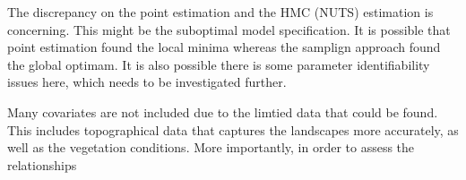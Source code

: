 \documentclass{article}
\begin{document}
The discrepancy on the point estimation and the HMC (NUTS) estimation is concerning. This might be the suboptimal model specification. It is possible that point estimation found the local minima whereas the samplign approach found the global optimam. It is also possible there is some parameter identifiability issues here, which needs to be investigated further. 

Many covariates are not included due to the limtied data that could be found. This includes topographical data that captures the landscapes more accurately, as well as the vegetation conditions. More importantly, in order to assess the relationships 



\clearpage



\end{document}
